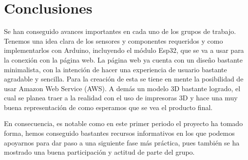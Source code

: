 \section{Conclusiones} %
\label{sec:conclusiones} %
\thispagestyle{plain}

Se han conseguido avances importantes en cada uno de los grupos de trabajo.
Tenemos una idea clara de los sensores y componentes requeridos y como
implementarlos con Arduino, incluyendo el módulo Esp32, que se va a usar para la
conexión con la página web. La página web ya cuenta con un diseño bastante
minimalista, con la intención de hacer una experiencia de usuario bastante
agradable y sencilla. Para la creación de esta se tiene en mente la posibilidad
de usar Amazon Web Service (AWS). A demás un modelo 3D bastante logrado, el
cual se planea traer a la realidad con el uso de impresoras 3D y hace una muy
buena representación de como esperamos que se vea el producto final.

En consecuencia, es notable como en este primer periodo el proyecto ha tomado
forma, hemos conseguido bastantes recursos informativos en los que podemos
apoyarnos para dar paso a una siguiente fase más práctica, pues también se ha
mostrado una buena participación y actitud de parte del grupo.
